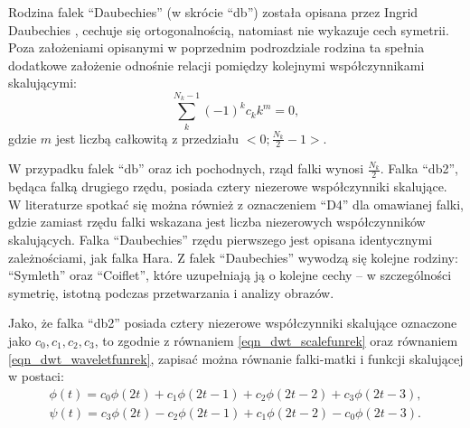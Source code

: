 Rodzina falek \enquote{Daubechies} (w skrócie \enquote{db}) została opisana przez Ingrid Daubechies \cite{vonesch_dbbasics}, cechuje się ortogonalnością, natomiast nie wykazuje cech symetrii. Poza założeniami opisanymi w poprzednim podrozdziale rodzina ta spełnia dodatkowe założenie odnośnie relacji pomiędzy kolejnymi współczynnikami skalującymi:
\begin{equation}
\sum _{k} ^{N_k-1} \left( -1 \right)^{k} c_{k} k^{m} = 0 \label{eqn_db_musthave},
\end{equation}
gdzie $m$ jest liczbą całkowitą z przedziału $<0;\frac{N_{k}}{2}-1>$.

W przypadku falek \enquote{db} oraz ich pochodnych, rząd falki wynosi $\frac{N_{k}}{2}$. Falka \enquote{db2}, będąca falką drugiego rzędu, posiada cztery niezerowe współczynniki skalujące. W literaturze spotkać się można również z oznaczeniem \enquote{D4} dla omawianej falki, gdzie zamiast rzędu falki wskazana jest liczba niezerowych współczynników skalujących. Falka \enquote{Daubechies} rzędu pierwszego jest opisana identycznymi zależnościami, jak falka Hara. Z falek \enquote{Daubechies} wywodzą się kolejne rodziny: \enquote{Symleth} oraz \enquote{Coiflet}, które uzupełniają ją o kolejne cechy -- w szczególności symetrię, istotną podczas przetwarzania i analizy obrazów.

Jako, że falka \enquote{db2} posiada cztery niezerowe współczynniki skalujące oznaczone jako $c_0, c_1, c_2, c_3$, to zgodnie z równaniem \eqref{eqn_dwt_scalefunrek} oraz równaniem \eqref{eqn_dwt_waveletfunrek}, zapisać można równanie falki-matki i funkcji skalującej w postaci:
\begin{gather}
\phi \left( t \right) = c_{0} \phi \left( 2t \right) + c_{1} \phi \left( 2t - 1 \right) + c_{2} \phi \left( 2t - 2 \right) + c_{3} \phi \left( 2t - 3 \right) \label{eqn_db2_scalefunrek}, \\
\psi \left( t \right) = c_{3} \phi \left( 2t \right) - c_{2} \phi \left( 2t - 1 \right) + c_{1} \phi \left( 2t - 2 \right) - c_{0} \phi \left( 2t - 3 \right) \label{eqn_db2_waveletfunrek}.
\end{gather}

